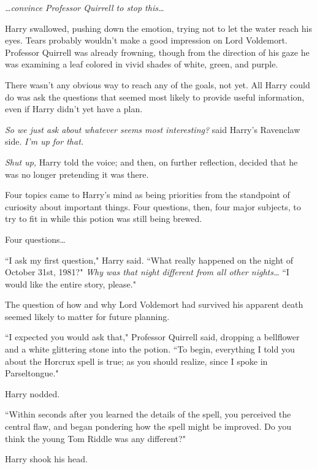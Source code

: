 \emph{{\ldots}convince Professor Quirrell to \emph{stop this{\ldots}}}

Harry swallowed, pushing down the emotion, trying not to let the water reach his eyes. Tears probably wouldn't make a good impression on Lord Voldemort. Professor Quirrell was already frowning, though from the direction of his gaze he was examining a leaf colored in vivid shades of white, green, and purple.

There wasn't any obvious way to reach any of the goals, not yet. All Harry could do was ask the questions that seemed most likely to provide useful information, even if Harry didn't yet have a plan.

\emph{So we just ask about whatever seems most interesting?} said Harry's Ravenclaw side. \emph{I'm up for that.}

\emph{Shut up,} Harry told the voice; and then, on further reflection, decided that he was no longer pretending it was there.

Four topics came to Harry's mind as being priorities from the standpoint of curiosity about important things. Four questions, then, four major subjects, to try to fit in while this potion was still being brewed.

Four questions{\ldots}

``I ask my first question," Harry said. ``What really happened on the night of October 31st, 1981?" \emph{Why was that night different from all other nights{\ldots}} ``I would like the entire story, please."

The question of how and why Lord Voldemort had survived his apparent death seemed likely to matter for future planning.

``I expected you would ask that," Professor Quirrell said, dropping a bellflower and a white glittering stone into the potion. ``To begin, everything I told you about the Horcrux spell is true; as you should realize, since I spoke in Parseltongue."

Harry nodded.

``Within seconds after you learned the details of the spell, you perceived the central flaw, and began pondering how the spell might be improved. Do you think the young Tom Riddle was any different?"

Harry shook his head.


